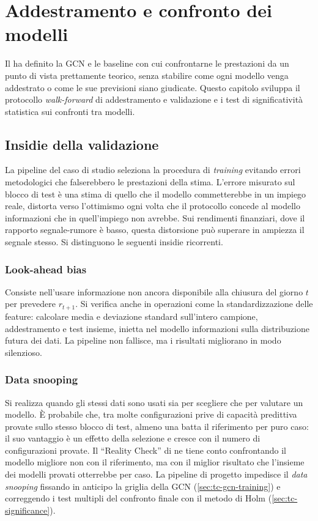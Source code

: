 \chapter{Addestramento e confronto dei modelli}
\label{ch:training-and-comparison}

Il  ha definito la GCN e le baseline con cui confrontarne le prestazioni da un punto di vista prettamente teorico, senza stabilire come ogni modello venga addestrato o come le sue previsioni siano giudicate. Questo capitolo sviluppa il protocollo \emph{walk-forward} di addestramento e validazione e i test di significatività statistica sui confronti tra modelli.

\section{Insidie della validazione}
\label{sec:tc-pitfalls}

La pipeline del caso di studio seleziona la procedura di \emph{training} evitando errori metodologici che falserebbero le prestazioni della stima. L'errore misurato sul blocco di test è una stima di quello che il modello commetterebbe in un impiego reale, distorta verso l'ottimismo ogni volta che il protocollo concede al modello informazioni che in quell'impiego non avrebbe. Sui rendimenti finanziari, dove il rapporto segnale-rumore è basso, questa distorsione può superare in ampiezza il segnale stesso. Si distinguono le seguenti insidie ricorrenti.

\subsection{Look-ahead bias}

Consiste nell'usare informazione non ancora disponibile alla chiusura del giorno $t$ per prevedere $r_{t+1}$. Si verifica anche in operazioni come la standardizzazione delle feature: calcolare media e deviazione standard sull'intero campione, addestramento e test insieme, inietta nel modello informazioni sulla distribuzione futura dei dati. La pipeline non fallisce, ma i risultati migliorano in modo silenzioso.

\subsection{Data snooping}

Si realizza quando gli stessi dati sono usati sia per scegliere che per valutare un modello. È probabile che, tra molte configurazioni prive di capacità predittiva provate sullo stesso blocco di test, almeno una batta il riferimento per puro caso: il suo vantaggio è un effetto della selezione e cresce con il numero di configurazioni provate. Il \enquote{Reality Check} di \textcite{white2000reality} ne tiene conto confrontando il modello migliore non con il riferimento, ma con il miglior risultato che l'insieme dei modelli provati otterrebbe per caso. La pipeline di progetto impedisce il \emph{data snooping} fissando in anticipo la griglia della GCN (\cref{sec:tc-gcn-training}) e correggendo i test multipli del confronto finale con il metodo di Holm (\cref{sec:tc-significance}).

